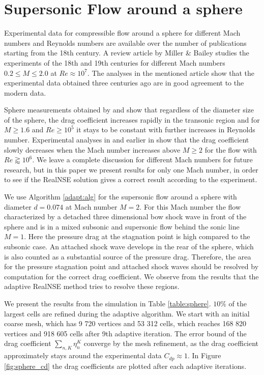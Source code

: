 \chapter{Supersonic Flow around a sphere}

Experimental data for compressible flow around a sphere for different Mach
numbers and Reynolds numbers are available over the number of publications
starting from the 18th century. A review article by Miller \&
Bailey \cite{Miller:1979} studies the experiments of the 18th and 19th
centuries for different Mach numbers $0.2
\leq M \leq 2.0$ at $Re \approx 10^7$. The analyses in the mentioned article
show that the experimental data obtained three centuries ago are in good
agreement to the modern data. 

Sphere measurements obtained by \cite{Miller:1979} and \cite{Bailey:1971}
show that regardless of the diameter size of the sphere, the drag coefficient
increases rapidly in the transonic region and for $M\geq1.6$ and $Re\geq 10^5$
it stays to be constant with further increases in Reynolds number. 
Experimental analyses in \cite{Bailey:1971} and earlier in \cite{Charters:1945}
show that the drag coefficient 
slowly decreases when the Mach number increases above $M\geq 2$ for the
flow with $Re \gtrapprox 10^6$. 
We leave a
complete discussion for different Mach numbers for future research, but in this
paper we present results for only one Mach number, in order
to see if the RealNSE solution gives a correct result according to the experiment.

We use Algorithm \ref{adapt:alg} for the supersonic flow
around a sphere  with diameter $d = 0.074$ at Mach number $M=2$. For this
Mach number the flow characterized by a detached three
dimensional bow shock wave in front of the sphere and is in a mixed
subsonic and supersonic flow behind the sonic line $M=1$. Here the pressure drag
at the stagnation point is high compared to the
subsonic
case. An attached shock
wave develops in the rear of the sphere, which is also counted as a
substantial source of the pressure drag. Therefore, the area for the
pressure stagnation point and attached shock waves should be resolved by
computation for the correct drag coefficient.
We observe from the results that the adaptive RealNSE method tries to resolve these
regions.

We present the results from the simulation in Table \ref{table:sphere}.
$10\%$ of the largest cells are refined during the adaptive algorithm.
We start with an initial coarse mesh, which has 9 720 vertices and 53 312 cells,
which reaches 168 820 vertices and 918 605 cells after 9th adaptive
iteration. The error bound of the drag coefficient
$\displaystyle\sum_{n,K}\eta_n^K$ converge by the
mesh refinement, as the drag coefficient approximately
stays around the experimental data $C_{dp} \approx 1$. In Figure
\ref{fig:sphere_cd} the drag coefficients are plotted after each adaptive
iterations.  

